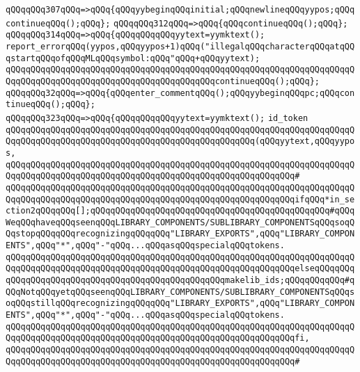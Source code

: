 \verb|qQQqqQQq307qQQq=>qQQq{qQQqyybeginqQQqinitial;qQQqnewlineqQQqyypos;qQQqcontinueqQQq();qQQq};|\newline
\verb|qQQqqQQq312qQQq=>qQQq{qQQqcontinueqQQq();qQQq};|\newline
\verb|qQQqqQQq314qQQq=>qQQq{qQQqqQQqqQQqyytext=yymktext();|\newline
\verb|report_errorqQQq(yypos,qQQqyypos+1)qQQq("illegalqQQqcharacterqQQqatqQQqstartqQQqofqQQqMLqQQqsymbol:qQQq"qQQq+qQQqyytext);|\newline
\verb|qQQqqQQqqQQqqQQqqQQqqQQqqQQqqQQqqQQqqQQqqQQqqQQqqQQqqQQqqQQqqQQqqQQqqQQqqQQqqQQqqQQqqQQqqQQqqQQqqQQqqQQqqQQqqQQqcontinueqQQq();qQQq};|\newline
\verb|qQQqqQQq32qQQq=>qQQq{qQQqenter_commentqQQq();qQQqyybeginqQQqpc;qQQqcontinueqQQq();qQQq};|\newline
\verb|qQQqqQQq323qQQq=>qQQq{qQQqqQQqqQQqyytext=yymktext();|\newline
\verb|id_token|\newline
\verb|qQQqqQQqqQQqqQQqqQQqqQQqqQQqqQQqqQQqqQQqqQQqqQQqqQQqqQQqqQQqqQQqqQQqqQQqqQQqqQQqqQQqqQQqqQQqqQQqqQQqqQQqqQQqqQQqqQQqqQQq(qQQqyytext,qQQqyypos,|\newline
\verb|qQQqqQQqqQQqqQQqqQQqqQQqqQQqqQQqqQQqqQQqqQQqqQQqqQQqqQQqqQQqqQQqqQQqqQQqqQQqqQQqqQQqqQQqqQQqqQQqqQQqqQQqqQQqqQQqqQQqqQQqqQQqqQQq#|\newline
\verb|qQQqqQQqqQQqqQQqqQQqqQQqqQQqqQQqqQQqqQQqqQQqqQQqqQQqqQQqqQQqqQQqqQQqqQQqqQQqqQQqqQQqqQQqqQQqqQQqqQQqqQQqqQQqqQQqqQQqqQQqqQQqqQQqifqQQq*in_section2qQQqqQQq[];qQQqqQQqqQQqqQQqqQQqqQQqqQQqqQQqqQQqqQQqqQQqqQQq#qQQqWeqQQqhaveqQQqseenqQQqLIBRARY_COMPONENTS/SUBLIBRARY_COMPONENTSqQQqsoqQQqstopqQQqqQQqrecognizingqQQqqQQq"LIBRARY_EXPORTS",qQQq"LIBRARY_COMPONENTS",qQQq"*",qQQq"-"qQQq...qQQqasqQQqspecialqQQqtokens.|\newline
\verb|qQQqqQQqqQQqqQQqqQQqqQQqqQQqqQQqqQQqqQQqqQQqqQQqqQQqqQQqqQQqqQQqqQQqqQQqqQQqqQQqqQQqqQQqqQQqqQQqqQQqqQQqqQQqqQQqqQQqqQQqqQQqqQQqelseqQQqqQQqqQQqqQQqqQQqqQQqqQQqqQQqqQQqqQQqqQQqqQQqqQQqmakelib_ids;qQQqqQQqqQQq#qQQqNotqQQqyetqQQqseenqQQqLIBRARY_COMPONENTS/SUBLIBRARY_COMPONENTSqQQqsoqQQqstillqQQqrecognizingqQQqqQQq"LIBRARY_EXPORTS",qQQq"LIBRARY_COMPONENTS",qQQq"*",qQQq"-"qQQq...qQQqasqQQqspecialqQQqtokens.|\newline
\verb|qQQqqQQqqQQqqQQqqQQqqQQqqQQqqQQqqQQqqQQqqQQqqQQqqQQqqQQqqQQqqQQqqQQqqQQqqQQqqQQqqQQqqQQqqQQqqQQqqQQqqQQqqQQqqQQqqQQqqQQqqQQqqQQqfi,|\newline
\verb|qQQqqQQqqQQqqQQqqQQqqQQqqQQqqQQqqQQqqQQqqQQqqQQqqQQqqQQqqQQqqQQqqQQqqQQqqQQqqQQqqQQqqQQqqQQqqQQqqQQqqQQqqQQqqQQqqQQqqQQqqQQqqQQq#|\newline
